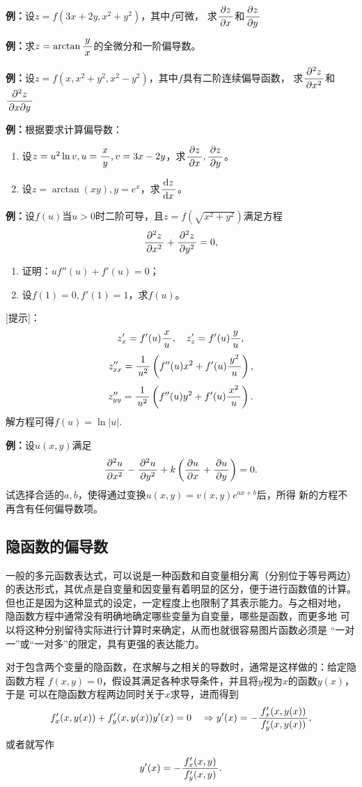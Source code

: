 {\bf 例：}设$z=f(3x+2y,x^2+y^2)$，其中$f$可微，
求$\df{\p z}{\p x}$和$\df{\p z}{\p y}$

{\bf 例：}求$z=\arctan\df yx$的全微分和一阶偏导数。

{\bf 例：}设$z=f(x,x^2+y^2,x^2-y^2)$，其中$f$具有二阶连续偏导函数，
求$\df{\p^2 z}{\p x^2}$和$\df{\p^2 z}{\p x\p y}$

{\bf 例：}根据要求计算偏导数：
\begin{enumerate}[(1)]
  \setlength{\itemindent}{1cm}
  \item 设$z=u^2\ln v,u=\df xy,v=3x-2y$，求$\df {\p z}{\p x},\df{\p z}{\p
  y}$。
  \item 设$z=\arctan(xy),y=e^x$，求$\df{\d z}{\d x}$。
\end{enumerate}

{\bf 例：}设$f(u)$当$u>0$时二阶可导，且$z=f(\sqrt{x^2+y^2})$满足方程
$$\df{\p^2z}{\p x^2}+\df{\p^2z}{\p y^2}=0,$$
\begin{enumerate}[(1)]
  \setlength{\itemindent}{1cm}
  \item 证明：$uf''(u)+f'(u)=0$；
  \item 设$f(1)=0,f'(1)=1$，求$f(u)$。 
\end{enumerate}

[提示]：
$$z'_x=f'(u)\df xu,\quad z'_z=f'(u)\df yu,$$
$$z''_{xx}=\df1{u^2}\left(f''(u)x^2+f'(u)\df{y^2}u\right),$$
$$z''_{yy}=\df1{u^2}\left(f''(u)y^2+f'(u)\df{x^2}u\right).$$
解方程可得$f(u)=\ln|u|$.

{\bf 例：}设$u(x,y)$满足
$$\df{\p^2 u}{\p x^2}-\df{\p^2 u}{\p y^2}
+k\left(\df{\p u}{\p x}+\df{\p u}{\p y}\right)=0.$$
试选择合适的$a,b$，使得通过变换$u(x,y)=v(x,y)e^{ax+b}$后，所得
新的方程不再含有任何偏导数项。

\subsection{隐函数的偏导数}

一般的多元函数表达式，可以说是一种函数和自变量相分离（分别位于等号两边）
的表达形式，其优点是自变量和因变量有着明显的区分，便于进行函数值的计算。
但也正是因为这种显式的设定，一定程度上也限制了其表示能力。与之相对地，
隐函数方程中通常没有明确地确定哪些变量为自变量，哪些是函数，而更多地
可以将这种分别留待实际进行计算时来确定，从而也就很容易图片函数必须是
“一对一”或“一对多”的限定，具有更强的表达能力。

对于包含两个变量的隐函数，在求解与之相关的导数时，通常是这样做的：给定隐函数方程
$f(x,y)=0$，假设其满足各种求导条件，并且将$y$视为$x$的函数$y(x)$，于是
可以在隐函数方程两边同时关于$x$求导，进而得到
$$f'_x(x,y(x))+f'_y(x,y(x))y'(x)=0
\quad\Rightarrow
y'(x)=-\df{f'_x(x,y(x))}{f'_y(x,y(x))},$$
或者就写作
$$y'(x)=-\df{f'_x(x,y)}{f'_y(x,y)}.$$

